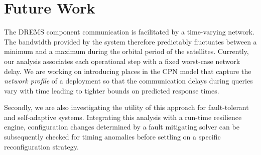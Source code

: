 \section{Future Work}
\label{sec:Future_Work}

The DREMS component communication is facilitated by a time-varying network. The bandwidth provided by the system therefore predictably fluctuates between a minimum and a maximum during the orbital period of the satellites. Currently, our analysis associates each operational step with a fixed worst-case network delay. We are working on introducing places in the CPN model that capture the \emph{network profile} of a deployment so that the communication delays during queries vary with time leading to tighter bounds on predicted response times. 

Secondly, we are also investigating the utility of this approach for fault-tolerant and self-adaptive systems. Integrating this analysis with a run-time resilience engine, configuration changes determined by a fault mitigating solver can be subsequently checked for timing anomalies before settling on a specific reconfiguration strategy. 

